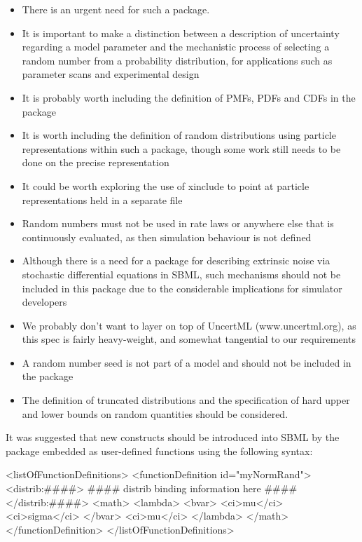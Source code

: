 \documentclass[draftspec]{sbmlpkgspec}
\newcommand{\uncertml}{UncertML\xspace}
\begin{document}
\begin{itemize}
\item There is an urgent need for such a package.
\item It is important to make a distinction between a description of
  uncertainty regarding a model parameter and the mechanistic process
  of selecting a random number from a probability distribution, for
  applications such as parameter scans and experimental design
\item It is probably worth including the definition of PMFs, PDFs and CDFs in the package
\item It is worth including the definition of random distributions using particle representations within such a package, though some work
 still needs to be done on the precise representation
\item It could be worth exploring the use of xinclude to point at particle
representations held in a separate file
\item Random numbers must not be used in rate laws or anywhere else that
 is continuously evaluated, as then simulation behaviour is not
 defined
\item Although there is a need for a package for describing extrinsic
 noise via stochastic differential equations in SBML, such mechanisms
 should not be included in this package due to the considerable
 implications for simulator developers
\item We probably don't want to layer on top of \uncertml
 (www.uncertml.org), as this spec is fairly heavy-weight, and
 somewhat tangential to our requirements
\item A random number seed is not part of a model and should not be
 included in the package
\item The definition of truncated distributions and the specification of
 hard upper and lower bounds on random quantities should be
 considered.
\end{itemize}

It was suggested that new constructs should be introduced into SBML by
the package embedded as user-defined functions using the following
syntax:

\begin{example}
<listOfFunctionDefinitions>
  <functionDefinition id="myNormRand">
    <distrib:####>
      #### distrib binding information here ####
    </distrib:####>
    <math>
      <lambda>
        <bvar>
          <ci>mu</ci>
          <ci>sigma</ci>
        </bvar>
        <ci>mu</ci>
      </lambda>
    </math>
  </functionDefinition>
</listOfFunctionDefinitions>
\end{example}
\end{document}
